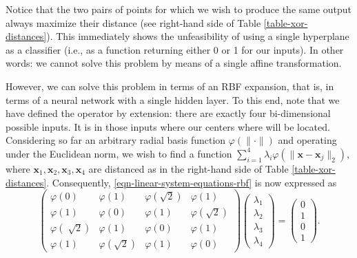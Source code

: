 \documentclass[12pt]{report} %
\newcommand{\tmmathbf}[1]{\ensuremath{\boldsymbol{#1}}}
\newcommand{\tmverbatim}[1]{\text{{\ttfamily{#1}}}}
\begin{document}
Notice that the two pairs of points for which we wish to produce the same
output always maximize their distance (see right-hand side of Table
\ref{table-xor-distances}). This immediately shows the unfeasibility of using
a single hyperplane as a classifier (i.e., as a function returning either 0 or
1 for our inputs). In other words: we cannot solve this problem by means of a
single affine transformation.

However, we can solve this problem in terms of an RBF expansion, that is, in
terms of a neural network with a single hidden layer. To this end, note that
we have defined the \tmverbatim{xor} operator by extension: there are exactly
four bi-dimensional possible inputs. It is in those inputs where our centers where will be located.
Considering so far an arbitrary radial basis function $\varphi (\| \cdot \|)$
and operating under the Euclidean norm, we wish to find a function $\sum_{i =
1}^4 \lambda_i \varphi (\| \tmmathbf{x}-\tmmathbf{x}_j \|_2)$, where
$\tmmathbf{x}_1, \tmmathbf{x}_2, \tmmathbf{x}_3, \tmmathbf{x}_4$ are distanced as in the
right-hand side of Table \ref{table-xor-distances}. Consequently,
\eqref{eqn-linear-system-equations-rbf} is now expressed as
\begin{equation}
    \left(\begin{array}{cccc}
     \varphi (0) & \varphi (1) & \varphi \left( \sqrt{2} \right) & \varphi
     (1)\\
     \varphi (1) & \varphi (0) & \varphi (1) & \varphi \left( \sqrt{2}
     \right)\\
     \varphi \left( \sqrt[]{2} \right) & \varphi (1) & \varphi (0) & \varphi
     (1)\\
     \varphi (1) & \varphi \left( \sqrt{2} \right) & \varphi (1) & \varphi (0)
   \end{array}\right) \left(\begin{array}{c}
     \lambda_1\\
     \lambda_2\\
     \lambda_3\\
     \lambda_4
   \end{array}\right) = \left(\begin{array}{c}
     0\\
     1\\
     0\\
     1
   \end{array}\right) .\label{interpolationconditionxor}
\end{equation}
\end{document}
